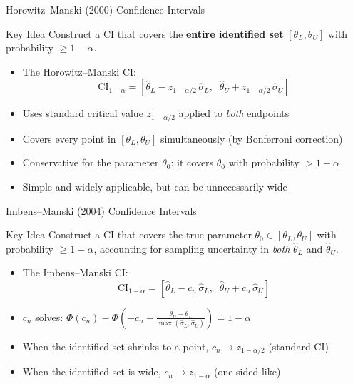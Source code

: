 \documentclass[10pt]{beamer}
\begin{document}
\begin{frame}{Horowitz--Manski (2000) Confidence Intervals}
  \begin{block}{Key Idea}
    Construct a CI that covers the \textbf{entire identified set} $[\theta_L, \theta_U]$ with probability $\geq 1-\alpha$.
  \end{block}
  \begin{itemize}
    \item The Horowitz--Manski CI:
      $$
        \text{CI}_{1-\alpha} = \left[\hat{\theta}_L - z_{1-\alpha/2}\, \hat{\sigma}_L,\;\; \hat{\theta}_U + z_{1-\alpha/2}\, \hat{\sigma}_U\right]
      $$
    \item Uses standard critical value $z_{1-\alpha/2}$ applied to \textit{both} endpoints
    \item Covers every point in $[\theta_L, \theta_U]$ simultaneously (by Bonferroni correction)
    \item Conservative for the parameter $\theta_0$: it covers $\theta_0$ with probability $> 1-\alpha$
    \item Simple and widely applicable, but can be unnecessarily wide
  \end{itemize}
\end{frame}

\begin{frame}{Imbens--Manski (2004) Confidence Intervals}
  \begin{block}{Key Idea}
    Construct a CI that covers the true parameter $\theta_0 \in [\theta_L, \theta_U]$ with probability $\geq 1-\alpha$, accounting for sampling uncertainty in \textit{both} $\hat{\theta}_L$ and $\hat{\theta}_U$.
  \end{block}
  \begin{itemize}
    \item The Imbens--Manski CI:
      $$
        \text{CI}_{1-\alpha} = \left[\hat{\theta}_L - c_n \, \hat{\sigma}_L,\;\; \hat{\theta}_U + c_n \, \hat{\sigma}_U\right]
      $$
    \item $c_n$ solves:
      $\Phi(c_n) - \Phi\!\left(-c_n - \frac{\hat{\theta}_U - \hat{\theta}_L}{\max(\hat{\sigma}_L, \hat{\sigma}_U)}\right) = 1 - \alpha$
    \item When the identified set shrinks to a point, $c_n \to z_{1-\alpha/2}$ (standard CI)
    \item When the identified set is wide, $c_n \to z_{1-\alpha}$ (one-sided-like)
  \end{itemize}
\end{frame}
\end{document}
